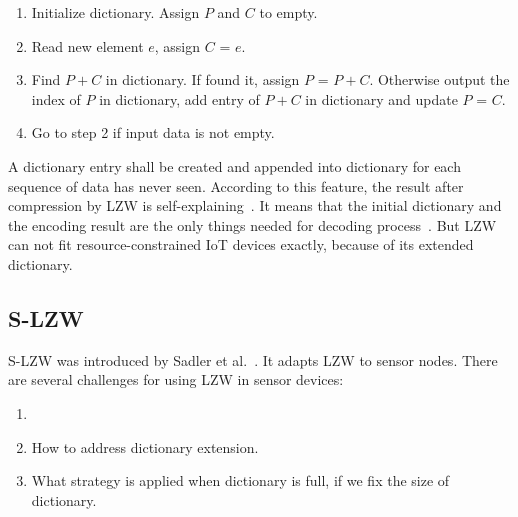 \begin{enumerate}
    \item Initialize dictionary. Assign $P$ and $C$ to empty.
    \item Read new element $e$, assign $C$ = $e$.
    \item Find $P+C$ in dictionary. If found it, assign $P$ = $P+C$. Otherwise
    output the index of $P$ in dictionary, add entry of $P+C$ in dictionary and
    update $P$ = $C$.
    \item Go to step 2 if input data is not empty.
\end{enumerate}

A dictionary entry shall be created and appended into dictionary for each
sequence of data has never seen. According to this feature, the result after
compression by LZW is self-explaining~\cite{welch1984technique}. It means
that the initial dictionary and the encoding result are the only things
needed for decoding process~\cite{welch1984technique}. But LZW can not fit
resource-constrained IoT devices exactly, because of its extended dictionary.

\subsection{S-LZW}

S-LZW was introduced by Sadler et al.~\cite{sadler2006data}. It adapts LZW to
sensor nodes. There are several challenges for using LZW in sensor devices:
\begin{enumerate}
    \item {}
    \item How to address dictionary extension.
    \item What strategy is applied when dictionary is full, if we fix the size
    of dictionary.
\end{enumerate}

